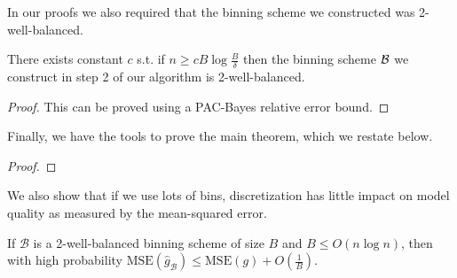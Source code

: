 In our proofs we also required that the binning scheme we constructed was 2-well-balanced.

\begin{lemma}
There exists constant $c$ s.t. if $n \geq c B \log{\frac{B}{\delta}}$ then the binning scheme $\mathcal{B}{}$ we construct in step 2 of our algorithm is 2-well-balanced.
\end{lemma}

\begin{proof}
This can be proved using a PAC-Bayes relative error bound.
\end{proof}

Finally, we have the tools to prove the main theorem, which we restate below.

\finalCalib*{}

\begin{proof}

\end{proof}

We also show that if we use lots of bins, discretization has little impact on model quality as measured by the mean-squared error.

\begin{theorem}
\label{thm:sharpness-bound}
If $\mathcal{B}$ is a 2-well-balanced binning scheme of size $B$ and $B \leq O(n\log{n})$, then with high probability $\mbox{MSE}(\hat{g}_{\mathcal{B}}) \leq \mbox{MSE}(g) + O(\frac{1}{B})$.
\end{theorem}

